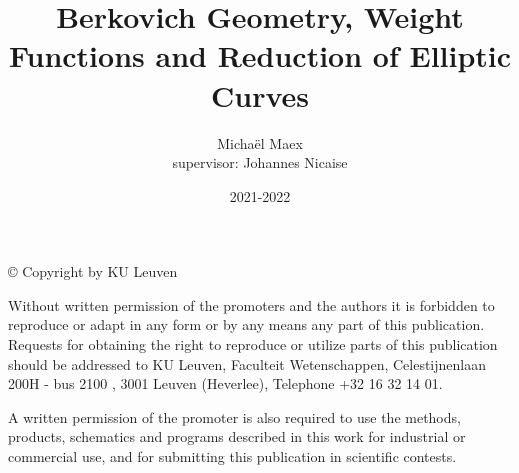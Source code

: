 \author{Michaël Maex\\ supervisor: Johannes Nicaise}
\title{Berkovich Geometry, Weight Functions and
Reduction of Elliptic Curves}
\date{2021-2022}
\thispagestyle{empty}
\vspace*{\fill}
\noindent © Copyright by KU Leuven

Without written permission of the promoters and the authors it is forbidden to reproduce or adapt in any form or by any means any part of this publication. Requests for obtaining the right to reproduce or utilize parts of this publication should be addressed to KU Leuven, Faculteit Wetenschappen, Celestijnenlaan 200H - bus 2100 , 3001 Leuven (Heverlee), Telephone +32 16 32 14 01.

A written permission of the promoter is also required to use the methods, products, schematics and programs described in this work for industrial or commercial use, and for submitting this publication in scientific contests.

\maketitle


